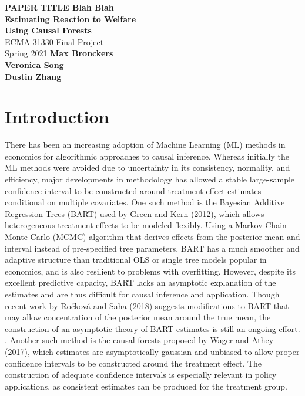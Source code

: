 \documentclass[12pt]{article}
\begin{document}
\begin{titlepage}
    \begin{center}
        \vspace*{1cm}
        \LARGE
        \textbf{PAPER TITLE Blah Blah\\ Estimating Reaction to Welfare\\ Using Causal Forests\\}
        \vspace{0.5cm}
        \Large
        ECMA 31330 Final Project \\ 
        \vspace{0.8cm}
        \large
        Spring 2021
        \vfill
        \vspace{5cm}
        \textbf{Max Bronckers \\ Veronica Song \\ Dustin Zhang}
    \end{center}
\end{titlepage}


\section{Introduction} 
There has been an increasing adoption of Machine Learning (ML) methods in
economics for algorithmic approaches to causal inference. Whereas initially the
ML methods were avoided due to uncertainty in its consistency, normality, and
efficiency, major developments in methodology has allowed a stable large-sample
confidence interval to be constructed around treatment effect estimates
conditional on multiple covariates.\cite{athey2019ML} One such method is the
Bayesian Additive Regression Trees (BART) used by Green and Kern (2012), which
allows heterogeneous treatment effects to be modeled flexibly. Using a Markov
Chain Monte Carlo (MCMC) algorithm that derives effects from the posterior mean
and interval instead of pre-specified tree parameters, BART has a much smoother
and adaptive structure than traditional OLS or single tree models popular in
economics, and is also resilient to problems with
overfitting.\cite{greenkern2012} However, despite its excellent predictive
capacity, BART lacks an asymptotic explanation of the estimates and are thus
difficult for causal inference and application. Though recent work by Ročková
and Saha (2018) suggests modifications to BART that may allow concentration of
the posterior mean around the true mean, the construction of an asymptotic
theory of BART estimates is still an ongoing effort. \cite{rockova2018theory}.
Another such method is the causal forests proposed by Wager and Athey (2017),
which estimates are asymptotically gaussian and unbiased to allow proper
confidence intervals to be constructed around the treatment effect. The
construction of adequate confidence intervals is especially relevant in policy
applications, as consistent estimates can be produced for the treatment
group.\cite{atheywager2019} \\ 
\end{document}
